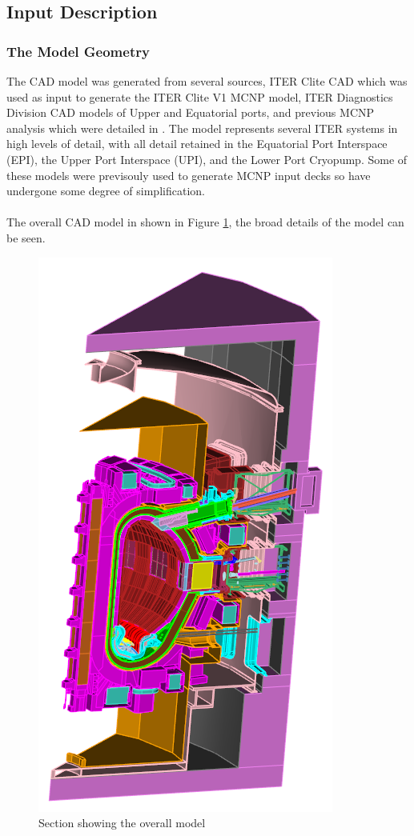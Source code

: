 \documentclass[12pt]{article}
\begin{document}
\subsection{Input Description}
\subsubsection{The Model Geometry}
The CAD model was generated from several sources, ITER Clite CAD which was used
as input to generate the ITER Clite V1 MCNP model, ITER Diagnostics Division
CAD models of Upper and Equatorial ports, and previous MCNP analysis which were
detailed in \cite{cad_origination}. The model represents several ITER systems
in high levels of detail, with all detail retained in the Equatorial Port
Interspace (EPI), the  Upper Port Interspace (UPI), and the Lower Port Cryopump.
Some of these models were previsouly used to generate MCNP input decks so have
undergone some degree of simplification.
\\
\\
The overall CAD model in shown in Figure \ref{fig:cad_iter_global}, the broad
details of the model can be seen. 
\begin{figure}[ht!]
  \centering
  \includegraphics[scale=0.8]{../plots/cad/global.png}
  \caption{Section showing the overall model}
  \label{fig:cad_iter_global}
\end{figure}
\end{document}
